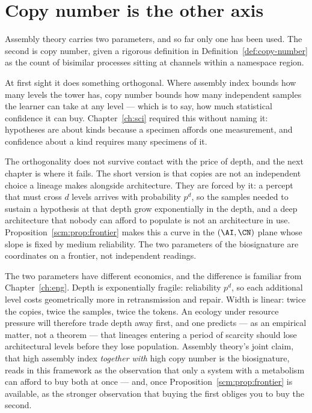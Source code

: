 \section{Copy number is the other axis}

Assembly theory carries two parameters, and so far only one has been
used.
The second is copy number, given a rigorous definition in
Definition~\ref{def:copy-number} as the count of bisimilar processes
sitting at channels within a namespace region.

At first sight it does something orthogonal.
Where assembly index bounds how many levels the tower has, copy number
bounds how many independent samples the learner can take at any level ---
which is to say, how much statistical confidence it can buy.
Chapter~\ref{ch:sci} required this without naming it: hypotheses are about
kinds because a specimen affords one measurement, and confidence about a
kind requires many specimens of it.

The orthogonality does not survive contact with the price of depth, and
the next chapter is where it fails.
The short version is that copies are not an independent choice a lineage
makes alongside architecture.
They are forced by it: a percept that must cross $d$ levels arrives with
probability $p^{d}$, so the samples needed to sustain a hypothesis at that
depth grow exponentially in the depth, and a deep architecture that nobody
can afford to populate is not an architecture in use.
Proposition~\ref{scm:prop:frontier} makes this a curve in the
$(\AI, \CN)$ plane whose slope is fixed by medium reliability.
The two parameters of the biosignature are coordinates on a frontier, not
independent readings.

\begin{remark}
\label{rmk:depth-width}
The two parameters have different economics, and the difference is
familiar from Chapter~\ref{ch:eng}.
Depth is exponentially fragile: reliability $p^d$, so each additional
level costs geometrically more in retransmission and repair.
Width is linear: twice the copies, twice the samples, twice the tokens.
An ecology under resource pressure will therefore trade depth away first,
and one predicts --- as an empirical matter, not a theorem --- that
lineages entering a period of scarcity should lose architectural levels
before they lose population.
Assembly theory's joint claim, that high assembly index \emph{together
with} high copy number is the biosignature, reads in this framework as
the observation that only a system with a metabolism can afford to buy
both at once --- and, once
Proposition~\ref{scm:prop:frontier} is available, as the stronger
observation that buying the first obliges you to buy the second.
\end{remark}

